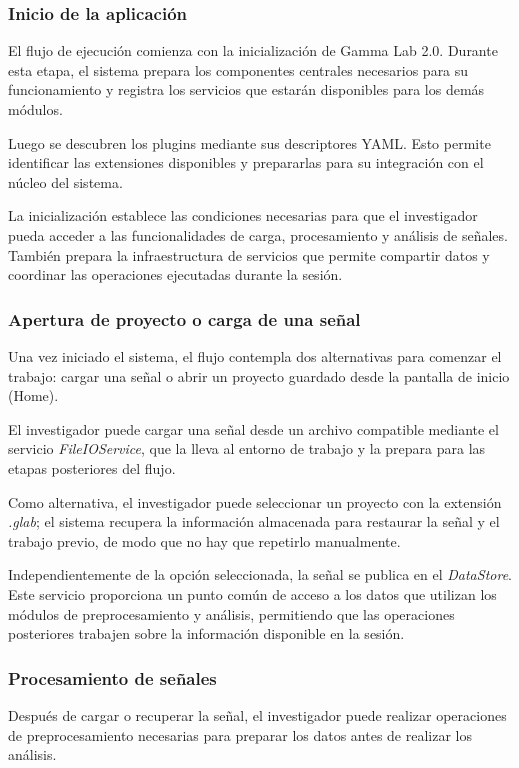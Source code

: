 \documentclass[11pt,a4paper]{article}
\DeclareRobustCommand{\_}{\textunderscore\allowbreak}
\begin{document}
\subsubsection{Inicio de la aplicación}
El flujo de ejecución comienza con la inicialización de Gamma Lab 2.0. Durante esta etapa, el sistema prepara los componentes centrales necesarios para su funcionamiento y registra los servicios que estarán disponibles para los demás módulos.

Luego se descubren los plugins mediante sus descriptores YAML. Esto permite identificar las extensiones disponibles y prepararlas para su integración con el núcleo del sistema.

La inicialización establece las condiciones necesarias para que el investigador pueda acceder a las funcionalidades de carga, procesamiento y análisis de señales. También prepara la infraestructura de servicios que permite compartir datos y coordinar las operaciones ejecutadas durante la sesión.


\subsubsection{Apertura de proyecto o carga de una señal}
Una vez iniciado el sistema, el flujo contempla dos alternativas para comenzar el trabajo: cargar una señal o abrir un proyecto guardado desde la pantalla de inicio (Home).

El investigador puede cargar una señal desde un archivo compatible mediante el servicio \textit{FileIOService}, que la lleva al entorno de trabajo y la prepara para las etapas posteriores del flujo.

Como alternativa, el investigador puede seleccionar un proyecto con la extensión \textit{.glab}; el sistema recupera la información almacenada para restaurar la señal y el trabajo previo, de modo que no hay que repetirlo manualmente.

Independientemente de la opción seleccionada, la señal se publica en el \textit{DataStore}. Este servicio proporciona un punto común de acceso a los datos que utilizan los módulos de preprocesamiento y análisis, permitiendo que las operaciones posteriores trabajen sobre la información disponible en la sesión.


\subsubsection{Procesamiento de señales}
Después de cargar o recuperar la señal, el investigador puede realizar operaciones de preprocesamiento necesarias para preparar los datos antes de realizar los análisis.
\end{document}
